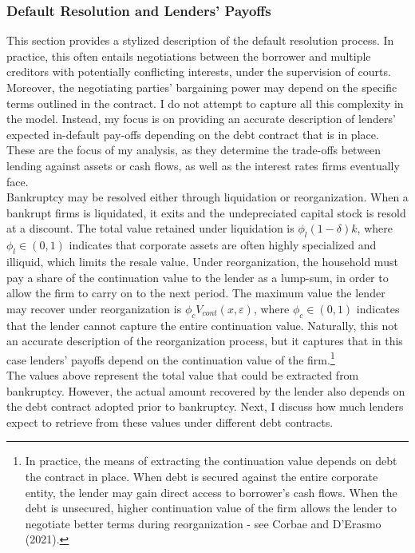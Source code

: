 \documentclass[12pt]{article}
\begin{document}
\subsubsection{Default Resolution and Lenders' Payoffs}   \label{sec:Default Resolution}
This section provides a stylized description of the default resolution process. In practice, this often entails negotiations between the borrower and multiple creditors with potentially conflicting interests, under the supervision of courts. Moreover, the negotiating parties' bargaining power may depend on the specific terms outlined in the contract. I do not attempt to capture all this complexity in the model. Instead, my focus is on providing an accurate description of lenders' expected in-default pay-offs depending on the debt contract that is in place. These are the focus of my analysis, as they determine the trade-offs between lending against assets or cash flows, as well as the interest rates firms eventually face. \vspace{3mm} \\
Bankruptcy may be resolved either through liquidation or reorganization. When a bankrupt firms is liquidated, it exits and the undepreciated capital stock is resold at a discount. The total value retained under liquidation is $\phi_l(1-\delta)k$, where $\phi_l \in (0,1)$ indicates that corporate assets are often highly specialized and illiquid, which limits the resale value. Under reorganization, the household must pay a share of the continuation value to the lender as a lump-sum, in order to allow the firm to carry on to the next period. The maximum value the lender may recover under reorganization is $\phi_c V_{cont}(x,\varepsilon)$, where $\phi_c \in (0,1)$ indicates that the lender cannot capture the entire continuation value. Naturally, this not an accurate description of the reorganization process, but it captures that in this case lenders' payoffs depend on the continuation value of the firm.\footnote{In practice, the means of extracting the continuation value depends on debt the contract in place. When debt is secured against the entire corporate entity, the lender may gain direct access to borrower's cash flows. When the debt is unsecured, higher continuation value of the firm allows the lender to negotiate better terms during reorganization - see Corbae and D'Erasmo (2021).}  \vspace{3mm} \\ 
The values above represent the total value that could be extracted from bankruptcy. However, the actual amount recovered by the lender also depends on the debt contract adopted prior to bankruptcy. Next, I discuss how much lenders expect to retrieve from these values under different debt contracts. \vspace{3mm} \\ 
\end{document}
